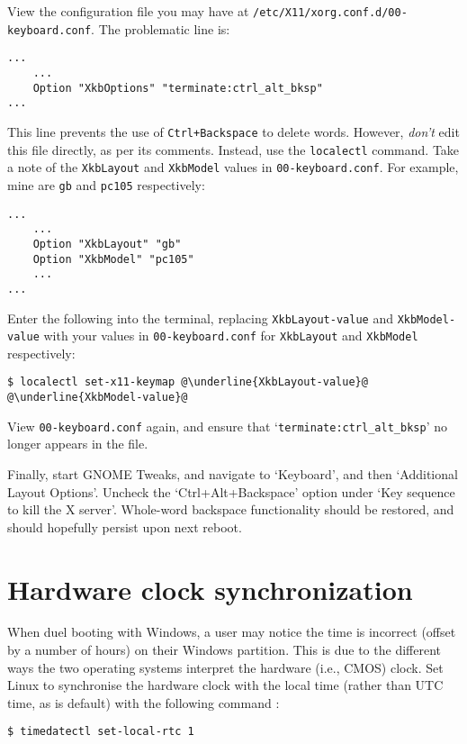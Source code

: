 \documentclass[a4paper]{article}
\begin{document}
View the configuration file you may have at \lstinline|/etc/X11/xorg.conf.d/00-keyboard.conf|.
The problematic line is:
\begin{lstlisting}
...
    ...
    Option "XkbOptions" "terminate:ctrl_alt_bksp"
...
\end{lstlisting}
This line prevents the use of \lstinline|Ctrl+Backspace| to delete words.
However, \emph{don't} edit this file directly, as per its comments.
Instead, use the \lstinline|localectl| command.
Take a note of the \lstinline|XkbLayout| and \lstinline|XkbModel| values in \lstinline|00-keyboard.conf|.
For example, mine are \lstinline|gb| and \lstinline|pc105| respectively:
\begin{lstlisting}
...
    ...
    Option "XkbLayout" "gb"
    Option "XkbModel" "pc105"
    ...
...
\end{lstlisting}
Enter the following into the terminal, replacing \lstinline|XkbLayout-value| and \lstinline|XkbModel-value| with your values in \lstinline|00-keyboard.conf| for \lstinline|XkbLayout| and \lstinline|XkbModel| respectively:
\begin{lstlisting}[escapechar=@]
$ localectl set-x11-keymap @\underline{XkbLayout-value}@ @\underline{XkbModel-value}@
\end{lstlisting}
View \lstinline|00-keyboard.conf| again, and ensure that `\lstinline|terminate:ctrl_alt_bksp|' no longer appears in the file.

Finally, start GNOME Tweaks, and navigate to `Keyboard', and then `Additional Layout Options'.
Uncheck the `Ctrl+Alt+Backspace' option under `Key sequence to kill the X server'.
Whole-word backspace functionality should be restored, and should hopefully persist upon next reboot.


\section{Hardware clock synchronization}

When duel booting with Windows, a user may notice the time is incorrect (offset by a number of hours) on their Windows partition.
This is due to the different ways the two operating systems interpret the hardware (i.e., CMOS) clock.
Set Linux to synchronise the hardware clock with the local time (rather than UTC time, as is default) with the following command \cite{wrong-time-duel-boot}:
\begin{lstlisting}
$ timedatectl set-local-rtc 1
\end{lstlisting}
\end{document}
